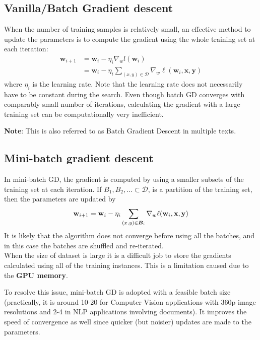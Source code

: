 \documentclass[12pt]{article}
\begin{document}
\subsection{Vanilla/Batch Gradient descent}
When the number of training samples is relatively small, an effective method to update the parameters is to compute the gradient using the whole training set at each iteration:
\begin{align*}
    \mathbf{w}_{i+1} &= \mathbf{w}_i - \eta_i \nabla_w l(\mathbf{w}_i)\\
    &= \mathbf{w}_i - \eta_i \sum_{(x, y)\in \mathcal{D}} \nabla_w \ell(\mathbf{w}_i,\mathbf{x},\mathbf{y})
\end{align*}
where $\eta_i$ is the learning rate. Note that the learning rate does not necessarily have to be constant during the search. Even though batch GD converges with comparably small number of iterations,
calculating the gradient with a large training set can be  computationally very inefficient.

\textbf{Note}: This is also referred to as Batch Gradient Descent in multiple texts.

\subsection{Mini-batch gradient descent}
In mini-batch GD, the gradient is computed by using a smaller subsets of the training set at each iteration. If $B_1, B_2, ... \subset \mathcal{D}$, is a partition of the training set, then the parameters are updated by
\begin{equation*}
\mathbf{w}_{i+1} = \mathbf{w}_i - \eta_i \sum_{(x,y) \in {\boldsymbol B}_i} \nabla_w\ell(\mathbf{w}_i,\mathbf{x},\mathbf{y})
\end{equation*}
It is likely that the algorithm does not converge before using all the batches, and in this case the batches are shuffled and re-iterated.
\\
When the size of dataset is large it is a difficult job to store the gradients calculated using all of the training instances. This is a limitation caused due to the \textbf{GPU memory}.

To resolve this issue, mini-batch GD is adopted with a feasible batch size (practically, it is around 10-20 for Computer Vision applications with 360p image resolutions and 2-4 in NLP applications involving documents). It improves the speed of convergence as well since quicker (but noisier) updates are made to the parameters.
\end{document}
